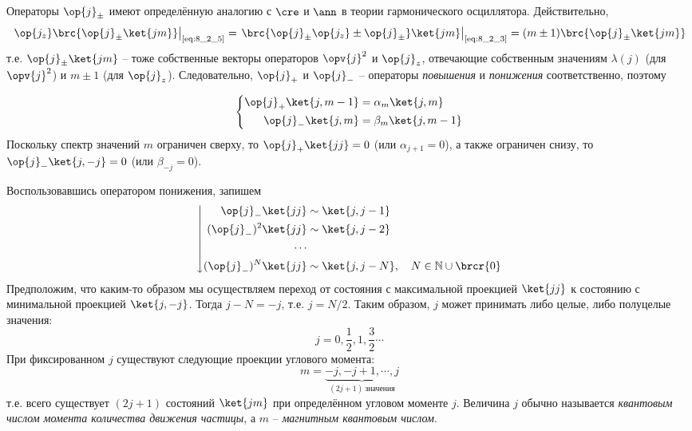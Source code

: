 Операторы $\op{j}_{\pm}$ имеют определённую аналогию с $\cre$ и $\ann$ в теории гармонического осциллятора. Действительно,
$$
\left. \op{j_z} \brc{\op{j}_{\pm} \ket{jm}} \right|_{\text{\eqref{eq:8_2_5}}}
= \left. \brc{\op{j}_{\pm} \op{j_z} \pm \op{j}_{\pm}} \ket{jm} \right|_{\text{\eqref{eq:8_2_3}}}
= (m \pm 1) \brc{\op{j}_{\pm} \ket{jm}}
$$%
%
т.е. $\op{j}_{\pm} \ket{jm}$ -- тоже собственные векторы операторов $\opv{j}^2$ и $\op{j}_z$, отвечающие собственным значениям $\lambda(j)$ (для $\opv{j}^2$) и $m \pm 1$ (для $\op{j}_z$). Следовательно, $\op{j}_{+}$ и $\op{j}_{-}$ -- операторы {\em повышения} и {\em понижения} соответственно, поэтому

\begin{equation}
\label{eq:8_2_6}
\left\{
\begin{aligned}
\op{j}_{+} \ket{j, m-1} &= \alpha_m \ket{j, m}\\
\op{j}_{-} \ket{j, m} &= \beta_m \ket{j, m-1}\\
\end{aligned}
\right.
\end{equation}%
%
Поскольку спектр значений $m$ ограничен сверху, то $\op{j}_{+} \ket{jj} = 0$ (или $\alpha_{j+1} = 0$), а также ограничен снизу, то $\op{j}_{-} \ket{j, -j} = 0$ (или $\beta_{-j} = 0$).

Воспользовавшись оператором понижения, запишем
$$
\left\downarrow
\begin{aligned}
\op{j}_{-} \ket{jj} & \sim \ket{j, j-1}\\
(\op{j}_{-})^2 \ket{jj} & \sim \ket{j, j-2}\\
\cdots \\
(\op{j}_{-})^N \ket{jj} & \sim \ket{j, j-N},~~~N \in \mathbb{N} \cup \brcr{0} \\
\end{aligned}
\right.
$$%
%
Предположим, что каким-то образом мы осуществляем переход от состояния с максимальной проекцией $\ket{jj}$ к состоянию с минимальной проекцией $\ket{j, -j}$. Тогда $j - N = -j$, т.е. $j = N/2$. Таким образом, $j$ может принимать либо целые, либо полуцелые значения:
$$
j = 0, \frac{1}{2}, 1, \frac{3}{2} \cdots
$$%
%
При фиксированном $j$ существуют следующие проекции углового момента:
$$
m = \underbrace{-j, -j + 1, \cdots, j}_{(2j + 1)~\text{значения}}
$$%
%
т.е. всего существует $(2j+1)$ состояний $\ket{jm}$ при определённом угловом моменте $j$. Величина $j$ обычно называется {\em квантовым числом момента количества движения частицы}, а $m$ -- {\em магнитным квантовым числом}.

